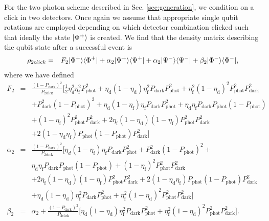 For the two photon scheme described in Sec. \ref{sec:generation}, we condition
on a click in two detectors. Once again we assume that appropriate single qubit
rotations are employed depending on which detector combination clicked such that
ideally the state $| \Phi^{+} \rangle$ is created. We find that the density matrix
describing the qubit state after a successful event is
\begin{eqnarray}
\rho_{2click}&=&F_{2}| \Phi^{+} \rangle\langle \Phi^{+} |+\alpha_{2}| \Psi^{+} \rangle
\langle \Psi^{+} |+\alpha_{2}| \Psi^{-} \rangle\langle \Psi^{-} |+\beta_{2}| \Phi^{-} \rangle\langle \Phi^{-} |,
\end{eqnarray} 
where we have defined
\begin{eqnarray}
F_{2}&=&\frac{(1-P_{\text{dark}})^{2}}{P_{\text{2click}}}
\Big[\frac{1}{2}\eta_{d}^{2}\eta_{\text{f}}^{2}P_{\text{phot}}^{2} 
+\eta_{\text{d}}(1-\eta_{\text{d}})\eta_{\text{f}}^{2}
P_{\text{dark}}P_{\text{phot}}^{2}
+\eta_{\text{f}}^{2}(1-\eta_{\text{d}})^{2}P_{\text{phot}}^{2}
P_{\text{dark}}^{2}\nonumber \\
&&+P_{\text{dark}}^{2}(1-P_{\text{phot}})^{2}+\eta_{\text{d}}
(1-\eta_{\text{f}})\eta_{\text{f}}P_{\text{dark}}P_{\text{phot}}^{2}
+\eta_{\text{d}}\eta_{\text{f}}P_{\text{dark}}P_{\text{phot}}
(1-P_{\text{phot}})\nonumber \\
&&+(1-\eta_{\text{f}})^{2}P_{\text{phot}}^{2}P_{\text{dark}}^{2}
 +2\eta_{\text{f}}(1-\eta_{\text{d}})(1-\eta_{\text{f}})
P_{\text{phot}}^{2}P_{\text{dark}}^{2}\nonumber \\
&&+2(1-\eta_{\text{d}}\eta_{\text{f}})P_{\text{phot}}
(1-P_{\text{phot}})P_{\text{dark}}^{2}\Big]  
\\
\alpha_{2}&=&\frac{(1-P_{\text{dark}})^{2}}{P_{\text{2click}}}
\Big[\eta_{d}(1-\eta_{\text{f}})\eta_{\text{f}}P_{\text{dark}}
P_{\text{phot}}^{2} +P_{\text{dark}}^{2}(1-P_{\text{phot}})^{2}+\nonumber \\
&&\eta_{\text{d}}
\eta_{\text{f}}P_{\text{dark}}P_{\text{phot}}(1-P_{\text{phot}})
+(1-\eta_{\text{f}})^{2}P_{\text{phot}}^{2}P_{\text{dark}}^{2}\nonumber \\
&&+2\eta_{\text{f}}(1-\eta_{\text{d}})(1-\eta_{\text{f}})
P_{\text{phot}}^{2}P_{\text{dark}}^{2}
 +2(1-\eta_{\text{d}}\eta_{\text{f}})P_{\text{phot}}
(1-P_{\text{phot}})P_{\text{dark}}^{2}\nonumber \\
&&+\eta_{\text{d}}(1-\eta_{\text{d}})\eta_{\text{f}}^{2}
P_{\text{dark}}P_{\text{phot}}^{2}
 +\eta_{\text{f}}^{2}(1-\eta_{\text{d}})^{2}P_{\text{phot}}^{2}
P_{\text{dark}}^{2}\Big]  
\\
\beta_{2}&=&\alpha_{2}+\frac{(1-P_{\text{dark}})^{2}}
{P_{\text{2click}}}\Big[\eta_{\text{d}}(1-\eta_{\text{d}})
\eta_{\text{f}}^{2}P_{\text{dark}}P_{\text{phot}}^{2}
+\eta_{\text{f}}^{2}(1-\eta_{\text{d}})^{2}P_{\text{phot}}^{2}
P_{\text{dark}}^{2}\Big].
\end{eqnarray}
